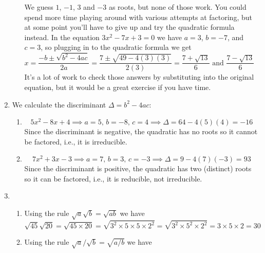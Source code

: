 \documentclass{article}
\newcommand{\ds}{\displaystyle}
\begin{document}
\begin{enumerate}
\begin{enumerate}
    We guess $1$, $-1$, $3$ and $-3$ as roots, but none of those work.  You
    could spend more time playing around with various attempts at factoring,
    but at some point you'll have to give up and try the quadratic formula
    instead.  In the equation $3x^2-7x+3=0$ we have $a=3$, $b=-7$, and $c=3$,
    so plugging in to the quadratic formula we get
    \begin{equation*}
      x = \frac{-b\pm \sqrt{b^2-4ac}}{2a}
      = \frac{7\pm \sqrt{49-4(3)(3)}}{2(3)}
      = \mbox{$\ds \frac{7+\sqrt{13}}{6}$ and $\ds \frac{7-\sqrt{13}}{6}$ }
    \end{equation*}
    It's a lot of work to check those answers by substituting into the
    original equation, but it would be a great exercise if you have time.
  \end{enumerate}
\item %
  We calculate the discriminant $\Delta = b^2-4ac$:
  \begin{enumerate}
  \item 
    \begin{equation*}
      5x^2-8x+4 
      \implies \mbox{$a=5$, $b=-8$, $c=4$}
      \implies \mbox{$\Delta = 64-4(5)(4) = -16$}
    \end{equation*}
    Since the discriminant is negative, the quadratic has no roots so it
    cannot be factored, i.e., it is irreducible.
  \item 
    \begin{equation*}
      7x^2+3x-3
      \implies \mbox{$a=7$, $b=3$, $c=-3$}
      \implies \mbox{$\Delta = 9-4(7)(-3) = 93$}
    \end{equation*}
    Since the discriminant is positive, the quadratic has two (distinct) roots
    so it can be factored, i.e., it is reducible, not irreducible.
  \end{enumerate}
\item %
  \begin{enumerate}
  \item Using the rule $\sqrt{a}\sqrt{b} = \sqrt{ab}$ we have
    \begin{equation*}
      \sqrt{45}\sqrt{20} 
      = \sqrt{45\times 20} = \sqrt{3^2\times 5\times 5\times 2^2}
      = \sqrt{3^2\times 5^2 \times 2^2}
      = 3\times 5 \times 2 = 30
    \end{equation*}
  \item Using the rule $\sqrt{a}/\sqrt{b}=\sqrt{a/b}$ we have

\end{enumerate}
\end{enumerate}
\end{document}
